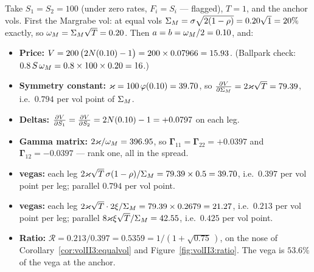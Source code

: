 \begin{example}\label{ex:volII3:anchor}
Take $S_1 = S_2 = 100$ (under zero rates, $F_i = S_i$ --- flagged), $T = 1$,
and the anchor vols. First the Margrabe vol: at equal vols
$\Sigma_M = \sigma\sqrt{2(1 - \rho)} = 0.20\sqrt{1} = 20\%$ exactly, so
$\omega_M = \Sigma_M\sqrt{T} = 0.20$. Then $a = b = \omega_M/2 = 0.10$, and:
\begin{itemize}[itemsep=0.2em]
\item \textbf{Price:} $V = 200\,\bigl(2N(0.10) - 1\bigr)
      = 200 \times 0.07966 = 15.93$. (Ballpark check:
      $0.8\,S\,\omega_M = 0.8 \times 100 \times 0.20 = 16$.)
\item \textbf{Symmetry constant:} $\varkappa = 100\,\varphi(0.10) = 39.70$, so
      $\frac{\partial V}{\partial \Sigma_M} = 2\varkappa\sqrt{T} = 79.39$, i.e.\ $0.794$ per vol point
      of $\Sigma_M$.
\item \textbf{Deltas:} $\frac{\partial V}{\partial S_1} = \frac{\partial V}{\partial S_2} = 2N(0.10) - 1
      = +0.0797$ on each leg.
\item \textbf{Gamma matrix:} $2\varkappa/\omega_M = 396.95$, so
      $\mathbf{\Gamma}_{11} = \mathbf{\Gamma}_{22} = +0.0397$ and
      $\mathbf{\Gamma}_{12} = -0.0397$ --- rank one, all in the spread.
\item \textbf{\stickyrho{} vegas:} each leg
      $2\varkappa\sqrt{T}\,\sigma(1 - \rho)/\Sigma_M = 79.39 \times 0.5 = 39.70$,
      i.e.\ $0.397$ per vol point per leg; parallel $0.794$ per vol point.
\item \textbf{\stickycvc{} vegas:} each leg
      $2\varkappa\sqrt{T}\cdot 2\xi/\Sigma_M = 79.39 \times 0.2679 = 21.27$,
      i.e.\ $0.213$ per vol point per leg; parallel
      $8\varkappa\xi\sqrt{T}/\Sigma_M = 42.55$, i.e.\ $0.425$ per vol point.
\item \textbf{Ratio:} $\mathcal{R} = 0.213/0.397 = 0.5359
      = 1\big/(1 + \sqrt{0.75}\,)$, on the nose of
      Corollary~\ref{cor:volII3:equalvol} and
      Figure~\ref{fig:volII3:ratio}. The \stickycvc{} vega is $53.6\%$ of the
      \stickyrho{} vega at the anchor.
\end{itemize}
\end{example}

